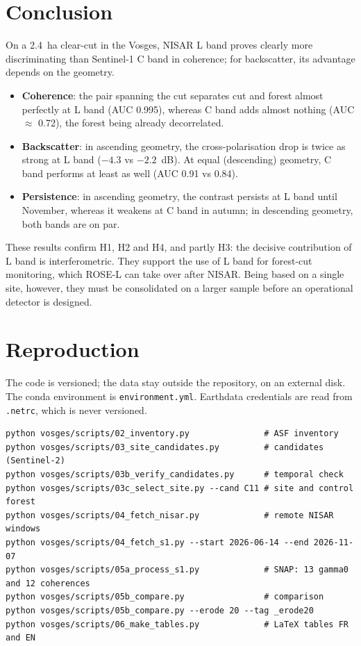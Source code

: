 \documentclass[11pt,a4paper]{article}
\begin{document}
\section{Conclusion}

On a 2.4~ha clear-cut in the Vosges, NISAR L band proves clearly more discriminating than Sentinel-1 C band in
coherence; for backscatter, its advantage depends on the geometry.
\begin{itemize}
\item \textbf{Coherence}: the pair spanning the cut separates cut and forest almost perfectly at L band
  (AUC 0.995), whereas C band adds almost nothing (AUC $\approx$ 0.72), the forest being already decorrelated.
\item \textbf{Backscatter}: in ascending geometry, the cross-polarisation drop is twice as strong at L band
  ($-4.3$ vs $-2.2$~dB). At equal (descending) geometry, C band performs at least as well (AUC 0.91 vs 0.84).
\item \textbf{Persistence}: in ascending geometry, the contrast persists at L band until November, whereas it weakens
  at C band in autumn; in descending geometry, both bands are on par.
\end{itemize}
These results confirm H1, H2 and H4, and partly H3: the decisive contribution of L band is interferometric. They
support the use of L band for forest-cut monitoring, which ROSE-L can take over after NISAR. Being based on a
single site, however, they must be consolidated on a larger sample before an operational detector is designed.

\printbibliography[heading=bibintoc,title={References}]

\appendix
\section{Reproduction}

The code is versioned; the data stay outside the repository, on an external disk. The conda environment is
\texttt{environment.yml}. Earthdata credentials are read from \texttt{.netrc}, which is never versioned.

\begin{verbatim}
python vosges/scripts/02_inventory.py               # ASF inventory
python vosges/scripts/03_site_candidates.py         # candidates (Sentinel-2)
python vosges/scripts/03b_verify_candidates.py      # temporal check
python vosges/scripts/03c_select_site.py --cand C11 # site and control forest
python vosges/scripts/04_fetch_nisar.py             # remote NISAR windows
python vosges/scripts/04_fetch_s1.py --start 2026-06-14 --end 2026-11-07
python vosges/scripts/05a_process_s1.py             # SNAP: 13 gamma0 and 12 coherences
python vosges/scripts/05b_compare.py                # comparison
python vosges/scripts/05b_compare.py --erode 20 --tag _erode20
python vosges/scripts/06_make_tables.py             # LaTeX tables FR and EN
\end{verbatim}
\end{document}
